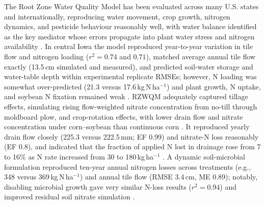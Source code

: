 \documentclass[11pt]{article}
\begin{document}
The Root Zone Water Quality Model has been evaluated across many U.S. states and internationally, reproducing water movement, crop growth, nitrogen dynamics, and pesticide behaviour reasonably well, with water balance identified as the key mediator whose errors propagate into plant water stress and nitrogen availability \parencite{Ma2001}. In central Iowa the model reproduced year-to-year variation in tile flow and nitrogen loading ($r^2 = 0.74$ and $0.71$), matched average annual tile flow exactly (13.5\,cm simulated and measured), and predicted soil-water storage and water-table depth within experimental replicate RMSEs; however, N loading was somewhat over-predicted (21.3 versus 17.6\,kg\,N\,ha$^{-1}$) and plant growth, N uptake, and soybean N fixation remained weak \parencite{Ma2007}. RZWQM adequately captured tillage effects, simulating rising flow-weighted nitrate concentration from no-till through moldboard plow, and crop-rotation effects, with lower drain flow and nitrate concentration under corn--soybean than continuous corn \parencite{Ma2007b}. It reproduced yearly drain flow closely (225.3 versus 222.5\,mm; EF 0.99) and nitrate-N loss reasonably (EF 0.8), and indicated that the fraction of applied N lost in drainage rose from 7 to 16\% as N rate increased from 30 to 180\,kg\,ha$^{-1}$ \parencite{Bakhsh2004}. A dynamic soil-microbial formulation reproduced ten-year annual nitrogen losses across treatments (e.g., 348 versus 369\,kg\,N\,ha$^{-1}$) and annual tile flow (RMSE 3.4\,cm, ME 0.89); notably, disabling microbial growth gave very similar N-loss results ($r^2 = 0.94$) and improved residual soil nitrate simulation \parencite{Ma2008}.
\end{document}
